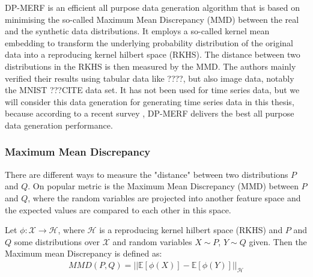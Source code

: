 DP-MERF \parencite{dpmerf} is an efficient all purpose data generation algorithm that is based on minimising the so-called Maximum Mean Discrepancy (MMD) between the real and the synthetic data distributions. It employs a so-called kernel mean embedding to transform the underlying probability distribution of the original data into a reproducing kernel hilbert space (RKHS). The distance between two distributions in the RKHS is then measured by the MMD. The authors mainly verified their results using tabular data like ????, but also image data, notably the MNIST ???CITE data set. It has not been used for time series data, but we will consider this data generation for generating time series data in this thesis, because according to a recent survey \parencite{hu2023sok}, DP-MERF delivers the best all purpose data generation performance.

\subsubsection{Maximum Mean Discrepancy}
There are different ways to measure the "distance" between two distributions $P$ and $Q$. On popular metric is the Maximum Mean Discrepancy (MMD) between $P$ and $Q$, where the random variables are projected into another feature space and the expected values are compared to each other in this space.

\begin{definition}[MMD]
    Let $\phi: \mathcal{X} \rightarrow \mathcal{H}$, where $\mathcal{H}$ is a reproducing kernel hilbert space (RKHS) and $P$ and $Q$ some distributions over $\mathcal{X}$ and random variables $X \sim P$, $Y \sim Q$ given. Then the Maximum mean Discrepancy is defined as:
    \begin{align}
        MMD(P,Q)=|| \mathbb{E}[\phi(X)] - \mathbb{E}[\phi(Y)] ||_\mathcal{H}
    \end{align}
\end{definition}

